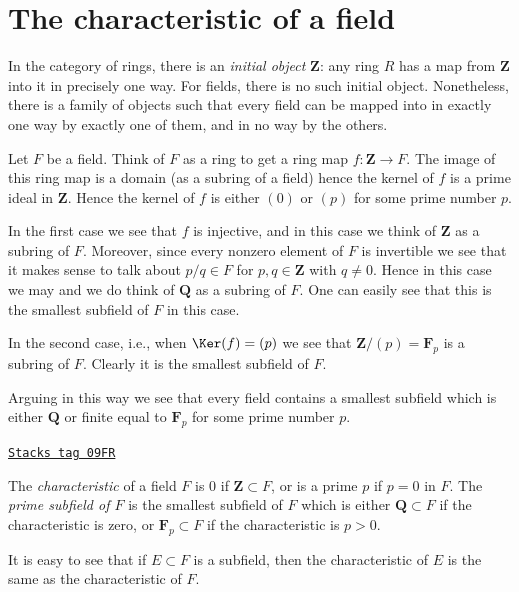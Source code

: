 \section{The characteristic of a field}
\label{fields-section-more-fields}
In the category of rings, there is an {\it initial object} $\mathbf{Z}$: any
ring $R$ has a map from $\mathbf{Z}$ into it in precisely one way. For fields,
there is no such initial object.
Nonetheless, there is a family of objects such that every field can be mapped
into in exactly one way by exactly one of them, and in no way by the others.

\medskip\noindent
Let $F$ be a field. Think of $F$ as a ring to get a ring map
$f : \mathbf{Z} \to F$. The image of this ring map is a domain
(as a subring of a field) hence the kernel of $f$ is a prime ideal
in $\mathbf{Z}$. Hence the kernel of $f$ is either $(0)$ or $(p)$ for
some prime number $p$.

\medskip\noindent
In the first case we see that $f$ is injective, and in this case
we think of $\mathbf{Z}$ as a subring of $F$. Moreover, since every
nonzero element of $F$ is invertible we see that it makes sense to
talk about $p/q \in F$ for $p, q \in \mathbf{Z}$ with $q \not = 0$.
Hence in this case we may and we do think of $\mathbf{Q}$ as a subring of $F$.
One can easily see that this is the smallest subfield of $F$ in this case.

\medskip\noindent
In the second case, i.e., when $\Ker(f) = (p)$ we see that
$\mathbf{Z}/(p) = \mathbf{F}_p$ is a subring of $F$. Clearly it is the
smallest subfield of $F$.

\medskip\noindent
Arguing in this way we see that every field contains a smallest subfield
which is either $\mathbf{Q}$ or finite equal to $\mathbf{F}_p$ for some
prime number $p$.

\begin{definition}[Characteristic]
\label{fields-definition-characteristic}
\href{https://stacks.math.columbia.edu/tag/09FR}{\texttt{Stacks tag 09FR}}

The {\it characteristic} of a field $F$ is $0$ if
$\mathbf{Z} \subset F$, or is a prime $p$ if $p = 0$ in $F$.
The {\it prime subfield of $F$} is the smallest subfield of $F$
which is either $\mathbf{Q} \subset F$ if the characteristic is zero, or
$\mathbf{F}_p \subset F$ if the characteristic is $p > 0$.
\end{definition}

It is easy to see that if $E \subset F$ is a subfield, then the
characteristic of $E$ is the same as the characteristic of $F$.

